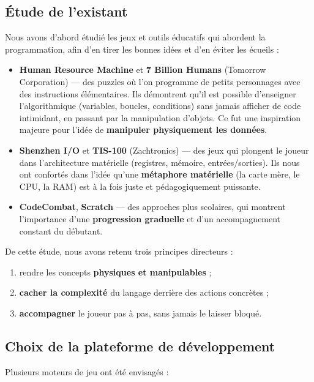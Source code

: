 \documentclass[12pt,a4paper]{article}
\begin{document}
\subsection{Étude de l'existant}

Nous avons d'abord étudié les jeux et outils éducatifs qui abordent la
programmation, afin d'en tirer les bonnes idées et d'en éviter les écueils :

\begin{itemize}[leftmargin=1.4em]
  \item \textbf{Human Resource Machine} et \textbf{7 Billion Humans} (Tomorrow
  Corporation) — des puzzles où l'on programme de petits personnages avec des
  instructions élémentaires. Ils démontrent qu'il est possible d'enseigner
  l'algorithmique (variables, boucles, conditions) sans jamais afficher de code
  intimidant, en passant par la manipulation d'objets. Ce fut une inspiration
  majeure pour l'idée de \textbf{manipuler physiquement les données}.
  \item \textbf{Shenzhen I/O} et \textbf{TIS-100} (Zachtronics) — des jeux qui
  plongent le joueur dans l'architecture matérielle (registres, mémoire,
  entrées/sorties). Ils nous ont confortés dans l'idée qu'une \textbf{métaphore
  matérielle} (la carte mère, le CPU, la RAM) est à la fois juste et
  pédagogiquement puissante.
  \item \textbf{CodeCombat}, \textbf{Scratch} — des approches plus scolaires, qui
  montrent l'importance d'une \textbf{progression graduelle} et d'un
  accompagnement constant du débutant.
\end{itemize}

De cette étude, nous avons retenu trois principes directeurs :
\begin{enumerate}[leftmargin=1.6em]
  \item rendre les concepts \textbf{physiques et manipulables} ;
  \item \textbf{cacher la complexité} du langage derrière des actions concrètes ;
  \item \textbf{accompagner} le joueur pas à pas, sans jamais le laisser bloqué.
\end{enumerate}

\subsection{Choix de la plateforme de développement}

Plusieurs moteurs de jeu ont été envisagés :
\end{document}
